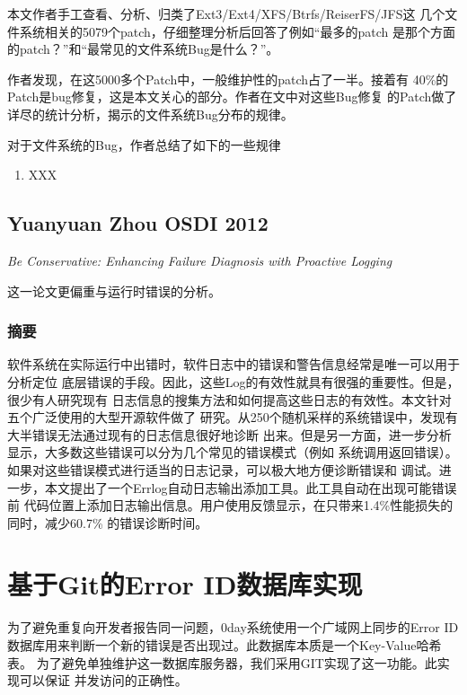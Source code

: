 \documentclass[a4paper]{article}
\begin{document}
本文作者手工查看、分析、归类了Ext3/Ext4/XFS/Btrfs/ReiserFS/JFS这
几个文件系统相关的5079个patch，仔细整理分析后回答了例如“最多的patch
是那个方面的patch？”和“最常见的文件系统Bug是什么？”。

作者发现，在这5000多个Patch中，一般维护性的patch占了一半。接着有
40\%的Patch是bug修复，这是本文关心的部分。作者在文中对这些Bug修复
的Patch做了详尽的统计分析，揭示的文件系统Bug分布的规律。

对于文件系统的Bug，作者总结了如下的一些规律

\begin{enumerate}
	\item XXX
\end{enumerate}



\subsection{Yuanyuan Zhou  OSDI 2012}
\emph{Be Conservative: Enhancing Failure Diagnosis with Proactive Logging}

这一论文更偏重与运行时错误的分析。

\subsubsection{摘要}
软件系统在实际运行中出错时，软件日志中的错误和警告信息经常是唯一可以用于分析定位
底层错误的手段。因此，这些Log的有效性就具有很强的重要性。但是，很少有人研究现有
日志信息的搜集方法和如何提高这些日志的有效性。本文针对五个广泛使用的大型开源软件做了
研究。从250个随机采样的系统错误中，发现有大半错误无法通过现有的日志信息很好地诊断
出来。但是另一方面，进一步分析显示，大多数这些错误可以分为几个常见的错误模式（例如
系统调用返回错误）。如果对这些错误模式进行适当的日志记录，可以极大地方便诊断错误和
调试。进一步，本文提出了一个Errlog自动日志输出添加工具。此工具自动在出现可能错误前
代码位置上添加日志输出信息。用户使用反馈显示，在只带来1.4\%性能损失的同时，减少60.7\%
的错误诊断时间。



\section{基于Git的Error ID数据库实现}
为了避免重复向开发者报告同一问题，0day系统使用一个广域网上同步的Error
ID数据库用来判断一个新的错误是否出现过。此数据库本质是一个Key-Value哈希表。
为了避免单独维护这一数据库服务器，我们采用GIT实现了这一功能。此实现可以保证
并发访问的正确性。
\end{document}
